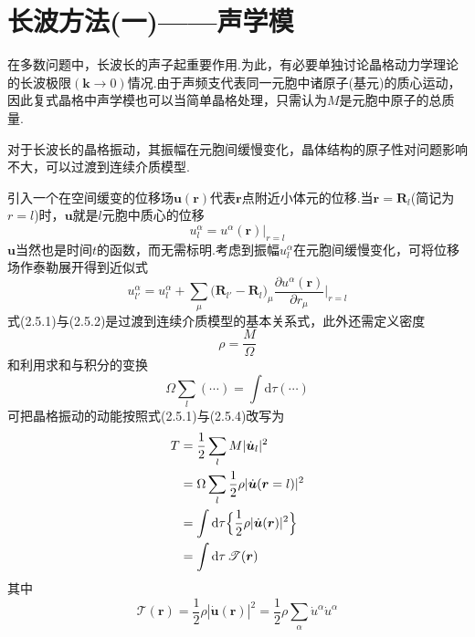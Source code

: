 \section{长波方法(一)——声学模}

在多数问题中，长波长的声子起重要作用.为此，有必要单独讨论晶格动力学理论的长波极限$(\boldsymbol{k}\to0)$情况.由于声频支代表同一元胞中诸原子(基元)的质心运动，因此复式晶格中声学模也可以当简单晶格处理，只需认为$M$是元胞中原子的总质量.

对于长波长的晶格振动，其振幅在元胞间缓慢变化，晶体结构的原子性对问题影响不大，可以过渡到连续介质模型.

引入一个在空间缓变的位移场$\boldsymbol{u}(\boldsymbol{r})$代表$\boldsymbol{r}$点附近小体元的位移.当$\boldsymbol{r}=\boldsymbol{R}_l$(简记为$r=l$)时，$\boldsymbol{u}$就是$l$元胞中质心的位移
\begin{equation}
  u_l^{\alpha}=u^{\alpha}(\boldsymbol{r})\big|_{r=l}
\end{equation}
$\boldsymbol{u}$当然也是时间$t$的函数，而无需标明.考虑到振幅$u_l^{\alpha}$在元胞间缓慢变化，可将位移场作泰勒展开得到近似式
\begin{equation}
  u_{l'}^{\alpha}=u_l^{\alpha}
  +\sum_{\mu}\bigl(\boldsymbol{R}_{l'}-\boldsymbol{R}_l\bigr)_{\mu}
  \frac{\partial u^{\alpha}(\boldsymbol{r})}{\partial r_{\mu}}\bigg|_{r=l}
\end{equation}
式(2.5.1)与(2.5.2)是过渡到连续介质模型的基本关系式，此外还需定义密度
\begin{equation}
  \rho=\frac{M}{\Omega}
\end{equation}
和利用求和与积分的变换
\begin{equation}
  \Omega\sum_l\left(\cdots\right)=\int\mathrm{d}\tau\left(\cdots\right)
\end{equation}
可把晶格振动的动能按照式(2.5.1)与(2.5.4)改写为
\begin{equation*}
\begin{aligned}
  T&=\frac{1}{2}\sum_l M|\dot{\boldsymbol{u}}_l|^2\\
  &=\Omega\sum_l\frac{1}{2}\rho|\dot{\boldsymbol{u}}(\boldsymbol{r}=l)|^2\\
  &=\int\mathrm{d}\tau\Bigl\{\frac{1}{2}\rho|\dot{\boldsymbol{u}}(\boldsymbol{r})|^2\Bigr\}\\
  &=\int\mathrm{d}\tau\,\mathscr{T}(\boldsymbol{r})
\end{aligned}
\end{equation*}
其中
\begin{equation}
  \mathscr{T}(\boldsymbol{r})=\frac{1}{2}\rho|\dot{\boldsymbol{u}}(\boldsymbol{r})|^2
  =\frac{1}{2}\rho\sum_{\alpha}\dot{u}^{\alpha}\dot{u}^{\alpha}
\end{equation}
